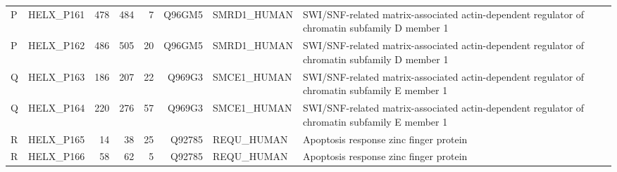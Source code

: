 \begin{longtable}{@{}llrrrrllp{5.2cm}@{}}
  P & HELX_P161 & 478 & 484 & 7 & Q96GM5 & SMRD1_HUMAN & SWI/SNF-related matrix-associated actin-dependent regulator of chromatin subfamily D member 1 \\
  P & HELX_P162 & 486 & 505 & 20 & Q96GM5 & SMRD1_HUMAN & SWI/SNF-related matrix-associated actin-dependent regulator of chromatin subfamily D member 1 \\
  Q & HELX_P163 & 186 & 207 & 22 & Q969G3 & SMCE1_HUMAN & SWI/SNF-related matrix-associated actin-dependent regulator of chromatin subfamily E member 1 \\
  Q & HELX_P164 & 220 & 276 & 57 & Q969G3 & SMCE1_HUMAN & SWI/SNF-related matrix-associated actin-dependent regulator of chromatin subfamily E member 1 \\
  R & HELX_P165 & 14 & 38 & 25 & Q92785 & REQU_HUMAN & Apoptosis response zinc finger protein \\
  R & HELX_P166 & 58 & 62 & 5 & Q92785 & REQU_HUMAN & Apoptosis response zinc finger protein \\
\end{longtable}
